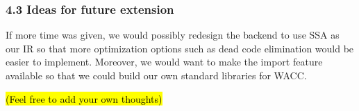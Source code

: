 \documentclass[10pt,a4paper]{report}
\begin{document}
  \subsubsection*{4.3 Ideas for future extension}
  If more time was given, we would possibly redesign the backend to use SSA as
  our IR so that more optimization options such as dead code elimination would
  be easier to implement. Moreover, we would want to make the import feature
  available so that we could build our own standard libraries for WACC.
  
  \hl{(Feel free to add your own thoughts)}
\end{document}
